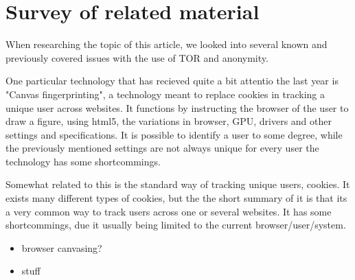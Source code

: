 \section{Survey of related material}
\label{sec:related}
When researching the topic of this article, we looked into several known and previously covered issues with the use of TOR and anonymity.

One particular technology that has recieved quite a bit attentio the last year is "Canvas fingerprinting", a technology meant to replace cookies in tracking a unique user across websites. It functions by instructing the browser of the user to draw a figure, using html5, the variations in browser, GPU, drivers and other settings and specifications. It is possible to identify a user to some degree, while the previously mentioned settings are not always unique for every user the technology has some shortcommings.~\cite{wiki_canvas}

Somewhat related to this is the standard way of tracking unique users, cookies.
It exists many different types of cookies, but the the short summary of it is that its a very common way to track users across one or several websites. It has some shortcommings, due it usually being limited to the current browser/user/system.~\cite{wiki_cookie}




\begin{itemize}
\item browser canvasing?
\item stuff
\end{itemize}